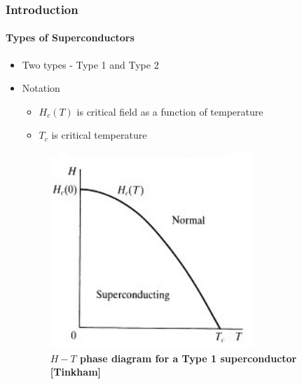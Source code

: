 \documentclass[12pt]{beamer}
\begin{document}
\begin{frame}
\frametitle{Introduction}
\framesubtitle{Types of Superconductors}


\begin{itemize}

  \item Two types - Type 1 and Type 2

  \pause

  \item Notation

  \pause

  \begin{itemize}
    \item \(H_c (T)\) is critical field as a function of temperature
    \pause
    \item \(T_c\) is critical temperature
  \end{itemize}

  \pause

  \begin{figure}[h]
    \includegraphics[scale = 0.5]{Type1.png}
    \caption{\textbf{\(H-T\) phase diagram for a Type 1 superconductor [Tinkham]}}
  \end{figure}

\end{itemize}


\end{frame}
\end{document}

